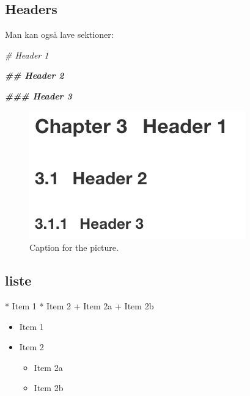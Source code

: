 \documentclass[
]{book}
\newenvironment{Shaded}{\begin{snugshade}}{\end{snugshade}}
\newcommand{\CommentTok}[1]{\textcolor[rgb]{0.56,0.35,0.01}{\textit{#1}}}
\newcommand{\DecValTok}[1]{\textcolor[rgb]{0.00,0.00,0.81}{#1}}
\newcommand{\DocumentationTok}[1]{\textcolor[rgb]{0.56,0.35,0.01}{\textbf{\textit{#1}}}}
\newcommand{\NormalTok}[1]{#1}
\newcommand{\SpecialCharTok}[1]{\textcolor[rgb]{0.00,0.00,0.00}{#1}}
\providecommand{\tightlist}{%
  \setlength{\itemsep}{0pt}\setlength{\parskip}{0pt}}
\begin{document}
\hypertarget{headers}{%
\subsection{Headers}\label{headers}}

Man kan også lave sektioner:

\begin{Shaded}
\begin{Highlighting}[]
\CommentTok{\# Header 1}

\DocumentationTok{\#\# Header 2}

\DocumentationTok{\#\#\# Header 3}
\end{Highlighting}
\end{Shaded}

\begin{figure}
\centering
\includegraphics{header_eksempel.png}
\caption{Caption for the picture.}
\end{figure}

\hypertarget{liste}{%
\subsection{liste}\label{liste}}

\begin{Shaded}
\begin{Highlighting}[]
\SpecialCharTok{*}\NormalTok{ Item }\DecValTok{1}
\SpecialCharTok{*}\NormalTok{ Item }\DecValTok{2}
    \SpecialCharTok{+}\NormalTok{ Item 2a}
    \SpecialCharTok{+}\NormalTok{ Item 2b}
\end{Highlighting}
\end{Shaded}

\begin{itemize}
\tightlist
\item
  Item 1
\item
  Item 2

  \begin{itemize}
  \tightlist
  \item
    Item 2a
  \item
    Item 2b
  \end{itemize}
\end{itemize}
\end{document}
